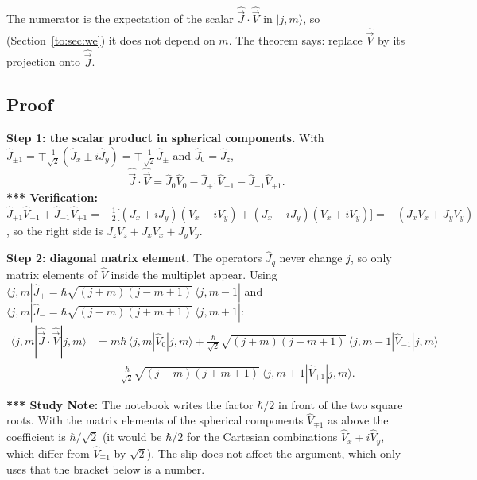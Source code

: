 \documentclass[11pt,a4paper]{article}
\begin{document}
The numerator is the expectation of the scalar $\hat{\vec J}\cdot\hat{\vec V}$ in $|j,m\rangle$, so (Section~\ref{to:sec:we}) it does not depend on $m$. The theorem says: replace $\hat{\vec V}$ by its projection onto $\hat{\vec J}$.

\subsection{Proof}
\textbf{Step 1: the scalar product in spherical components.} With $\hat J_{\pm1}=\mp\tfrac1{\sqrt2}(\hat J_x\pm i\hat J_y)=\mp\tfrac1{\sqrt2}\hat J_\pm$ and $\hat J_0=\hat J_z$,
\[
\hat{\vec J}\cdot\hat{\vec V}=\hat J_0\hat V_0-\hat J_{+1}\hat V_{-1}-\hat J_{-1}\hat V_{+1}.
\]
\textbf{*** Verification:} $\hat J_{+1}\hat V_{-1}+\hat J_{-1}\hat V_{+1}=-\tfrac12\big[(J_x+iJ_y)(V_x-iV_y)+(J_x-iJ_y)(V_x+iV_y)\big]=-(J_xV_x+J_yV_y)$, so the right side is $J_zV_z+J_xV_x+J_yV_y$.

\textbf{Step 2: diagonal matrix element.} The operators $\hat J_q$ never change $j$, so only matrix elements of $\hat V$ inside the multiplet appear. Using $\langle j,m|\hat J_+=\hbar\sqrt{(j+m)(j-m+1)}\,\langle j,m-1|$ and $\langle j,m|\hat J_-=\hbar\sqrt{(j-m)(j+m+1)}\,\langle j,m+1|$:
\begin{align*}
\langle j,m|\hat{\vec J}\cdot\hat{\vec V}|j,m\rangle&=m\hbar\,\langle j,m|\hat V_0|j,m\rangle+\frac\hbar{\sqrt2}\sqrt{(j+m)(j-m+1)}\ \langle j,m-1|\hat V_{-1}|j,m\rangle\\
&\quad-\frac\hbar{\sqrt2}\sqrt{(j-m)(j+m+1)}\ \langle j,m+1|\hat V_{+1}|j,m\rangle .
\end{align*}

\textbf{*** Study Note:} The notebook writes the factor $\hbar/2$ in front of the two square roots. With the matrix elements of the spherical components $\hat V_{\mp1}$ as above the coefficient is $\hbar/\sqrt2$ (it would be $\hbar/2$ for the Cartesian combinations $\hat V_x\mp i\hat V_y$, which differ from $\hat V_{\mp1}$ by $\sqrt2$). The slip does not affect the argument, which only uses that the bracket below is a number.
\end{document}
